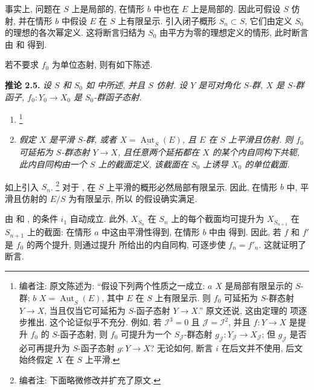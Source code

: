 事实上, 问题在 \(S\) 上是局部的, 在情形 \(b\) 中也在 \(E\) 上是局部的.
因此可假设 \(S\) 仿射, 并在情形 \(b\) 中假设
\(E\) 在 \(S\) 上有限呈示. 引入闭子概形 \(S_n\subset S\),
它们由定义 \(S_0\) 的理想的各次幂定义.
这将断言归结为 \(S_0\) 由平方为零的理想定义的情形,
此时断言由  和
 得到.

若不要求 \(f_0\) 为单位态射, 则有如下陈述.

\medskip
\noindent{}\textbf{推论 2.5.}
\textit{设 \(S\) 和 \(S_0\) 如 
中所述, 并且 \(S\) 仿射. 设 \(Y\) 是可对角化 \(S\)-群,
\(X\) 是 \(S\)-群函子, \(f_0:Y_0\to X_0\) 是
\(S_0\)-群函子态射.}
\begin{enumerate}
\item[\(i\)]\footnote{编者注: 原文陈述为:
``假设下列两个性质之一成立: \(a\) \(X\) 是局部有限呈示的
\(S\)-群; \(b\)
\(X=\underline{\operatorname{Aut}}_S(E)\), 其中 \(E\) 在 \(S\)
上有限呈示. 则 \(f_0\) 可延拓为 \(S\)-群态射
\(Y\to X\), 当且仅当它可延拓为 \(S\)-函子态射 \(Y\to X\).''
原文还说, 这由定理的 
项逐步推出. 这个论证似乎不充分. 例如, 若
\(\mathscr I^3=0\) 且 \(\mathscr J=\mathscr I^2\),
并且 \(f:Y\to X\) 是提升 \(f_0\) 的 \(S\)-函子态射,
则 \(f_0\) 可提升为一个 \(S_{\mathscr J}\)-群态射
\(g_{\mathscr J}:Y_{\mathscr J}\to X_{\mathscr J}\);
但 \(g_{\mathscr J}\) 是否必可再提升为 \(S\)-函子态射 \(g:Y\to X\)?
无论如何, 断言 \(i\) 在后文并不使用, 后文始终假定 \(X\) 在 \(S\) 上平滑.}
\item[\SGAInlineRefTarget{sga3:iii:corollary:2-5:item:ii}(ii)]
\textit{假定 \(X\) 是平滑 \(S\)-群, 或者
\(X=\underline{\operatorname{Aut}}_S(E)\), 且 \(E\) 在 \(S\) 上平滑且仿射.
则 \(f_0\) 可延拓为 \(S\)-群态射 \(Y\to X\),
且任意两个延拓都在 \(X\) 的某个内自同构下共轭,
此内自同构由一个 \(S\) 上的截面定义,
该截面在 \(S_0\) 上诱导 \(X_0\) 的单位截面.}
\end{enumerate}

如上引入 \(S_n\).
\footnote{编者注: 下面略微修改并扩充了原文.}
对于 ,
在 \(S\) 上平滑的概形必然局部有限呈示.
因此, 在情形 \(b\) 中, 平滑且仿射的 \(E/S\) 为有限呈示,
所以  的假设确实满足.

由  和
,
 的条件 \(i_1\) 自动成立.
此外, \(X_{S_n}\) 在 \(S_n\) 上的每个截面均可提升为
\(X_{S_{n+1}}\) 在 \(S_{n+1}\) 上的截面:
在情形 \(a\) 中这由平滑性得到,
在情形 \(b\) 中由  得到.
因此, 若 \(f\) 和 \(f'\) 是 \(f_0\) 的两个提升,
则通过提升 
所给出的内自同构, 可逐步使 \(f_n=f'_n\). 这就证明了断言.

